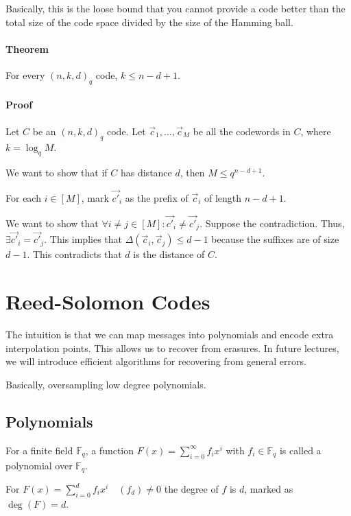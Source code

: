 \documentclass{idc_msc}
\newcommand{\Fq}[1][q]{{\mathbb{F}_{#1}}}
\begin{document}
Basically, this is the loose bound that you cannot provide a code better than the total size of the code space divided by the size of the Hamming ball.

\paragraph{Theorem}

For every \((n,k,d)_q\) code, \(k \le n - d + 1\).

\paragraph{Proof}

Let \(C\) be an \((n,k,d)_q\) code.
Let \(\vec{c}_1,\ldots,\vec{c}_M\) be all the codewords in \(C\), where \(k=\log_q M\).

We want to show that if \(C\) has distance \(d\), then \(M \le q^{n-d+1}\).

For each \(i \in [M]\), mark \(\vec{c'}_i\) as the prefix of \(\vec{c}_i\) of length \(n - d + 1\).

We want to show that \(\forall i \ne j \in [M] : \vec{c'}_i \ne \vec{c'}_j\).
Suppose the contradiction. Thus, \(\exists \vec{c'}_i = \vec{c'}_j\).
This implies that \(\Delta(\vec{c}_i, \vec{c}_j) \le d-1\) because the suffixes are of size \(d-1\).
This contradicts that \(d\) is the distance of \(C\).


\clearpage
\section{Reed-Solomon Codes}

The intuition is that we can map messages into polynomials and encode extra interpolation points.
This allows us to recover from erasures. In future lectures, we will introduce efficient algorithms for recovering from general errors.

Basically, oversampling low degree polynomials.

\subsection{Polynomials}

For a finite field \(\Fq\), a function \(F(x) = \sum_{i=0}^\infty f_i x^i\) with \(f_i \in \Fq\) is called a polynomial over \(\Fq\).

For \(F(x) = \sum_{i=0}^d f_i x^i \quad (f_d) \ne 0\) the degree of \(f\) is \(d\), marked as \(\deg(F) = d\).
\end{document}
